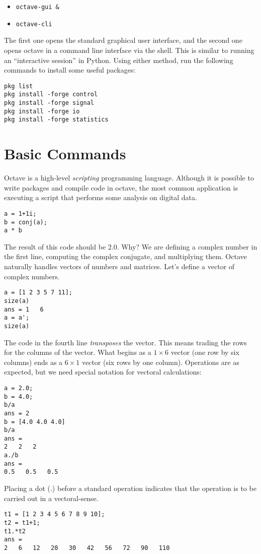 \documentclass[10pt]{article}
\begin{document}
\begin{itemize}
\item \verb+octave-gui &+
\item \verb+octave-cli+
\end{itemize}

The first one opens the standard graphical user interface, and the second one opens octave in a command line interface via the shell.  This is similar to running an ``interactive session'' in Python.  Using either method, run the following commands to install some useful packages:

\begin{verbatim}
pkg list
pkg install -forge control
pkg install -forge signal
pkg install -forge io
pkg install -forge statistics
\end{verbatim}

\section{Basic Commands}

Octave is a high-level \textit{scripting} programming language.  Although it is possible to write packages and compile code in octave, the most common application is executing a script that performs some analysis on digital data. \\
\begin{verbatim}
a = 1+1i;
b = conj(a);
a * b
\end{verbatim}
The result of this code should be 2.0.  Why?  We are defining a complex number in the first line, computing the complex conjugate, and multiplying them.  Octave naturally handles vectors of numbers and matrices.  Let's define a vector of complex numbers. \\
\begin{verbatim}
a = [1 2 3 5 7 11];
size(a)
ans = 1   6
a = a';
size(a)
\end{verbatim}
The code in the fourth line \textit{transposes} the vector.  This means trading the rows for the columns of the vector.  What begins as a $1 \times 6$ vector (one row by six columns) ends as a $6 \times 1$ vector (six rows by one column).  Operations are as expected, but we need special notation for vectoral calculations:
\begin{verbatim}
a = 2.0;
b = 4.0;
b/a
ans = 2
b = [4.0 4.0 4.0]
b/a
ans =
2   2   2
a./b
ans =
0.5   0.5   0.5
\end{verbatim}
Placing a dot (.) before a standard operation indicates that the operation is to be carried out in a vectoral-sense.
\begin{verbatim}
t1 = [1 2 3 4 5 6 7 8 9 10];
t2 = t1+1;
t1.*t2
ans =
2   6   12   20   30   42   56   72   90   110
\end{verbatim}
\end{document}
